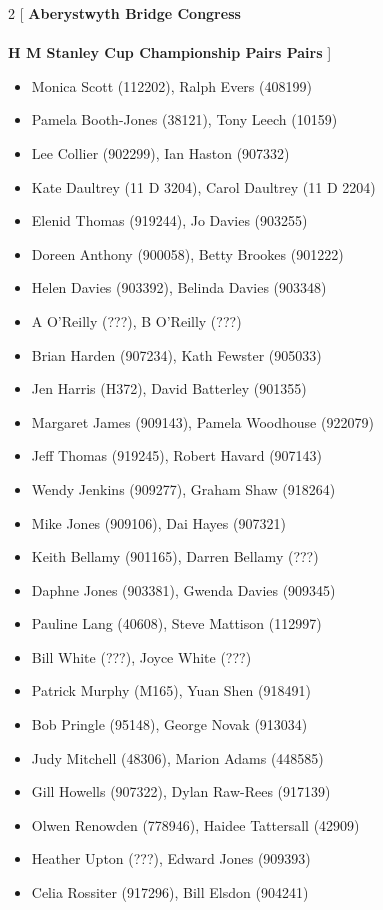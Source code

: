 \documentclass[11pt]{article}
\begin{document}
\begin{multicols}{2}
[
{\bf {\Large Aberystwyth Bridge Congress}}\\
\ \\
{\bf {\large H M Stanley Cup Championship Pairs Pairs}}
]

\begin{itemize}
\item Monica Scott (112202),
Ralph Evers (408199)
\item Pamela Booth-Jones (38121),
Tony Leech (10159)
\item Lee Collier (902299),
Ian Haston (907332)
\item Kate Daultrey (11 D 3204),
Carol Daultrey (11 D 2204)
\item Elenid Thomas (919244),
Jo Davies (903255)
\item Doreen Anthony (900058),
Betty Brookes (901222)
\item Helen Davies (903392),
Belinda Davies (903348)
\item A O'Reilly (???),
B O'Reilly (???)
\item Brian Harden (907234),
Kath Fewster (905033)
\item Jen Harris (H372),
David Batterley (901355)
\item Margaret James (909143),
Pamela Woodhouse (922079)
\item Jeff Thomas (919245),
Robert Havard (907143)
\item Wendy Jenkins (909277),
Graham Shaw (918264)
\item Mike Jones (909106),
Dai Hayes (907321)
\item Keith Bellamy (901165),
Darren Bellamy (???)
\item Daphne Jones (903381),
Gwenda Davies (909345)
\item Pauline Lang (40608),
Steve Mattison (112997)
\item Bill White (???),
Joyce White (???)
\item Patrick Murphy (M165),
Yuan Shen (918491)
\item Bob Pringle (95148),
George Novak (913034)
\item Judy Mitchell (48306),
Marion Adams (448585)
\item Gill Howells (907322),
Dylan Raw-Rees (917139)
\item Olwen Renowden (778946),
Haidee Tattersall (42909)
\item Heather Upton (???),
Edward Jones (909393)
\item Celia Rossiter (917296),
Bill Elsdon (904241)

\end{itemize}
\end{multicols}
\end{document}
